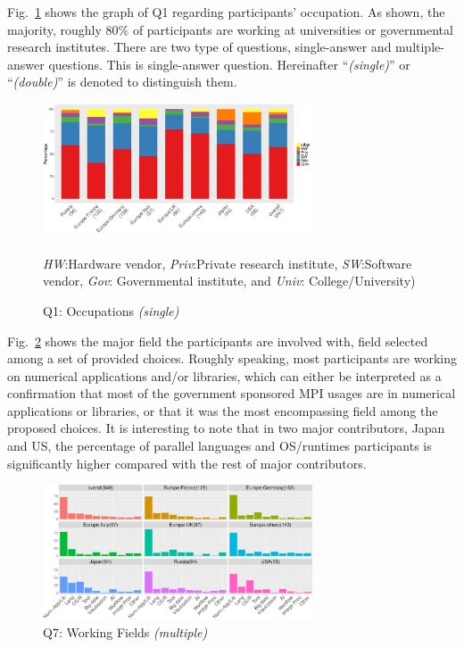 \documentclass[preprint,5p,times]{elsarticle}
\def\myquote#1{{\it #1}}
\newcommand{\revision}[2]{{\color{blue}#2}}
\def\mcountries{major contributors\xspace{}}%
\begin{document}
Fig.~\ref{fig:occupations} shows the graph of Q1 regarding participants'
occupation. As shown, the majority, roughly 80\% of participants are working at
universities or governmental research institutes. \revision{}{There
  are two type of questions, single-answer and multiple-answer
  questions. This is single-answer question. Hereinafter
  ``{\it (single)}'' or ``{\it (double)}'' is denoted to distinguish them.}
%
\begin{figure}[tb]
  \begin{center}
    \includegraphics[width=8.0cm]{R-scripts/Q1.pdf}
  \begin{center}
  \end{center}
  \vspace{-10mm}
         {\footnotesize
           \myquote{HW}:Hardware vendor,
           \myquote{Priv}:Private research institute,
           \myquote{SW}:Software vendor, \myquote{Gov}:
           Governmental institute, and \myquote{Univ}:
           College/University)
    }
    \caption{Q1: Occupations {\it(single)}}
    \label{fig:occupations}
  \end{center}
\end{figure}

Fig.~\ref{fig:working-fields} shows the major field the participants are
involved with, field selected among a set of provided choices.
Roughly speaking, most participants are working on numerical applications and/or
libraries, which can either be interpreted as a confirmation that most of the
government sponsored MPI usages are in numerical applications or libraries, or
that it was the most encompassing field among the proposed choices.
%
It is interesting to note that in \revision{2}{two} \mcountries, Japan and US, the percentage of
parallel languages and OS/runtimes participants is significantly higher compared
with the rest of \mcountries.

\begin{figure}[tb]
  \begin{center}
    \includegraphics[width=8.0cm]{R-scripts/Q7.pdf}
    \vspace{-2mm}
    \caption{Q7: Working Fields {\it(multiple)}}
    \label{fig:working-fields}
  \end{center}
\end{figure}
\end{document}
